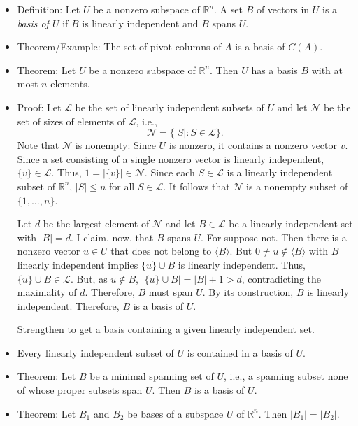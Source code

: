 \documentclass{amsart}
\newcommand{\RR}{\mathbb{R}}
\begin{document}
\begin{itemize}
  \setlength{\itemsep}{0.5em}
  \item Definition: Let $U$ be a nonzero subspace of $\RR^n$.
  A set $B$ of vectors in $U$ is a \emph{basis of $U$} if $B$ is linearly independent and $B$ spans $U$.

  \item Theorem/Example: The set of pivot columns of $A$ is a basis of $C(A)$.

  \item Theorem: Let $U$ be a nonzero subspace of $\RR^n$. Then $U$ has a basis $B$ with at most $n$ elements.

  \item Proof: Let $\mathcal{L}$ be the set of linearly independent subsets of $U$ and let $\mathcal{N}$ be the set of sizes of elements of $\mathcal{L}$, i.e.,
  $$
  \mathcal{N} = \{|S| : S\in \mathcal{L}\}.
  $$
  Note that $\mathcal{N}$ is nonempty:
  Since $U$ is nonzero, it contains a nonzero vector $v$.
  Since a set consisting of a single nonzero vector is linearly independent, $\{v\}\in\mathcal{L}$.
  Thus, $1=|\{v\}|\in\mathcal{N}$.
  Since each $S\in\mathcal{L}$ is a linearly independent subset of $\RR^n$, $|S|\leq n$ for all $S\in \mathcal{L}$.
  It follows that $\mathcal{N}$ is a nonempty subset of $\{1,\ldots,n\}$.

  Let $d$ be the largest element of $\mathcal{N}$ and let $B\in \mathcal{L}$ be a linearly independent set with $|B|=d$.
  I claim, now, that $B$ spans $U$.
  For suppose not.
  Then there is a nonzero vector $u\in U$ that does not belong to $\langle B\rangle$.
  But $0\neq u\notin \langle B\rangle$ with $B$ linearly independent implies $\{u\}\cup B$ is linearly independent.
  Thus, $\{u\}\cup B\in\mathcal{L}$. But, as $u\notin B$, $|\{u\}\cup B| = |B| + 1 > d$, contradicting the maximality of $d$.
  Therefore, $B$ must span $U$. By its construction, $B$ is linearly independent. Therefore, $B$ is a basis of $U$.

  Strengthen to get a basis containing a given linearly independent set.

  \item Every linearly independent subset of $U$ is contained in a basis of $U$.

  \item Theorem: Let $B$ be a minimal spanning set of $U$, i.e., a spanning subset none of whose proper subsets span $U$.
  Then $B$ is a basis of $U$.

  \item Theorem: Let $B_1$ and $B_2$ be bases of a subspace $U$ of $\RR^n$.
  Then $|B_1|=|B_2|$.


\end{itemize}
\end{document}
